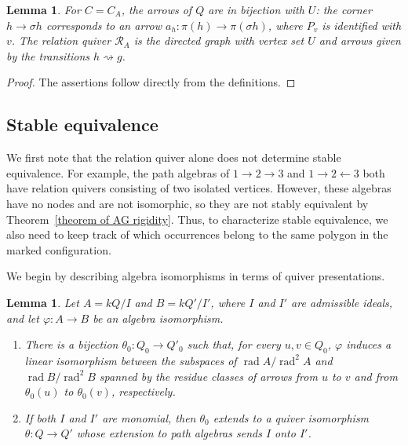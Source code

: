 \documentclass[11pt]{article}
\newcommand{\rad}{\operatorname{rad}}
\newtheorem{lemma}[theorem]{Lemma}
\theoremstyle{definition}
\begin{document}
		\begin{lemma}\label{lemma of configuration relation quiver}
			For $C=C_A$, the arrows of $Q$ are in bijection with $U$: the corner $h\to\sigma h$ corresponds to an arrow $a_h:\pi(h)\to\pi(\sigma h)$, where $P_v$ is identified with $v$. The relation quiver $\mathcal R_A$ is the directed graph with vertex set $U$ and arrows given by the transitions $h\rightsquigarrow g$.
		\end{lemma}

		\begin{proof}
			The assertions follow directly from the definitions.
		\end{proof}

	\subsection{Stable equivalence}

		We first note that the relation quiver alone does not determine stable equivalence. For example, the path algebras of $1\to2\to3$ and $1\to2\leftarrow3$ both have relation quivers consisting of two isolated vertices. However, these algebras have no nodes and are not isomorphic, so they are not stably equivalent by Theorem~\ref{theorem of AG rigidity}.
		Thus, to characterize stable equivalence, we also need to keep track of which occurrences belong to the same polygon in the marked configuration.

		We begin by describing algebra isomorphisms in terms of quiver presentations.

		\begin{lemma}\label{lemma of monomial presentation isomorphism}
			Let $A=kQ/I$ and $B=kQ'/I'$, where $I$ and $I'$ are admissible ideals, and let $\varphi:A\to B$ be an algebra isomorphism.
			\begin{enumerate}
				\item
				There is a bijection $\theta_0:Q_0\to Q'_0$ such that, for every $u,v\in Q_0$, $\varphi$ induces a linear isomorphism between the subspaces of $\rad A/\rad^2 A$ and $\rad B/\rad^2 B$ spanned by the residue classes of arrows from $u$ to $v$ and from $\theta_0(u)$ to $\theta_0(v)$, respectively.

				\item
				If both $I$ and $I'$ are monomial, then $\theta_0$ extends to a quiver isomorphism $\theta:Q\to Q'$ whose extension to path algebras sends $I$ onto $I'$.
			\end{enumerate}
		\end{lemma}
\end{document}
